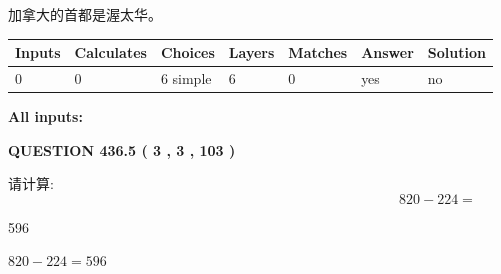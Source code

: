 \documentclass{ctexart}
\begin{document}
 
加拿大的首都是渥太华。
 
 
\noindent{}
 
 
   
   
   
   
\noindent\begin{tabular}{|l|l|l|l|l|l|l|}
 \hline
Inputs & Calculates & Choices & Layers & Matches & Answer & Solution \\ \hline
 0  & 
 0  & 
 6
  simple  
  & 
 6  & 
 0  & 
  yes & 
  no 
  \\ \hline
 \end{tabular}
   
   
   
   
\noindent{}
   
   
   
   
\noindent\vspace{0.1in}\hspace{-0.08in} {\textbf{\Large{All inputs: }}}
   
   
  
\vspace{0.2in}
  
{\textbf{\Large{QUESTION
436.5 
 ( 3 , 3 , 103 )
}}}
  
  
 
请计算:
\begin{equation}
820 -   %
224 = \nonumber
\end{equation}
 
 
 
\noindent{}
 
 

596
 
 
\noindent{}
 
 

 
 
 
\noindent{}
 
 

$ %
820 -  %
224=   %
596$
 
 
\noindent{}
 
\end{document}
